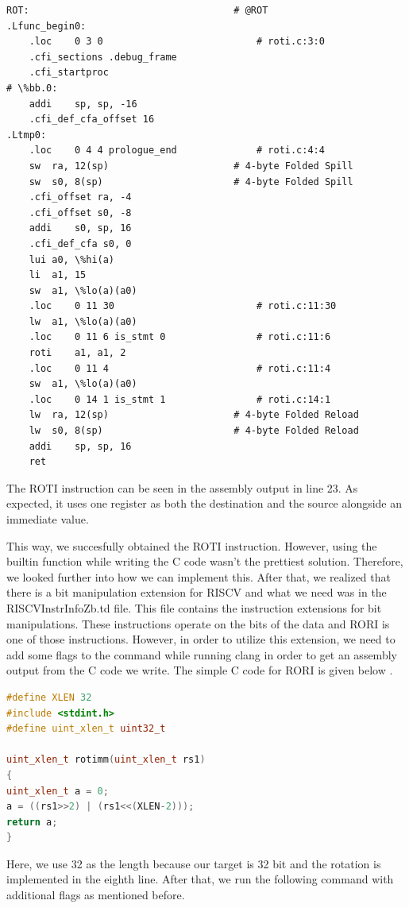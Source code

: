 \begin{lstlisting}
ROT:                                    # @ROT
.Lfunc_begin0:
	.loc	0 3 0                           # roti.c:3:0
	.cfi_sections .debug_frame
	.cfi_startproc
# \%bb.0:
	addi	sp, sp, -16
	.cfi_def_cfa_offset 16
.Ltmp0:
	.loc	0 4 4 prologue_end              # roti.c:4:4
	sw	ra, 12(sp)                      # 4-byte Folded Spill
	sw	s0, 8(sp)                       # 4-byte Folded Spill
	.cfi_offset ra, -4
	.cfi_offset s0, -8
	addi	s0, sp, 16
	.cfi_def_cfa s0, 0
	lui	a0, \%hi(a)
	li	a1, 15
	sw	a1, \%lo(a)(a0)
	.loc	0 11 30                         # roti.c:11:30
	lw	a1, \%lo(a)(a0)
	.loc	0 11 6 is_stmt 0                # roti.c:11:6
	roti	a1, a1, 2
	.loc	0 11 4                          # roti.c:11:4
	sw	a1, \%lo(a)(a0)
	.loc	0 14 1 is_stmt 1                # roti.c:14:1
	lw	ra, 12(sp)                      # 4-byte Folded Reload
	lw	s0, 8(sp)                       # 4-byte Folded Reload
	addi	sp, sp, 16
	ret
\end{lstlisting}

The ROTI instruction can be seen in the assembly output in line 23. As expected, it uses one register as both  the destination and the source alongside an immediate value.

This way, we succesfully obtained the ROTI instruction. However, using the builtin function while writing the C code wasn’t the prettiest solution. Therefore, we looked further into how we can implement this. After that, we realized that there is a bit manipulation extension for RISCV and what we need was in the RISCVInstrInfoZb.td file. This file contains the instruction extensions for bit manipulations. These instructions operate on the bits of the data and RORI is one of those instructions. However, in order to utilize this extension, we need to add some flags to the command while running clang in order to get an assembly output from the C code we write. The simple C code for RORI is given below .%

\begin{lstlisting}[language=C++]
#define XLEN 32
#include <stdint.h>
#define uint_xlen_t uint32_t

uint_xlen_t rotimm(uint_xlen_t rs1)
{
uint_xlen_t a = 0;
a = ((rs1>>2) | (rs1<<(XLEN-2)));
return a;
}
\end{lstlisting}

Here, we use 32 as the length because our target is 32 bit and the rotation is implemented in the eighth line. After that, we run the following command with additional flags as mentioned before.

